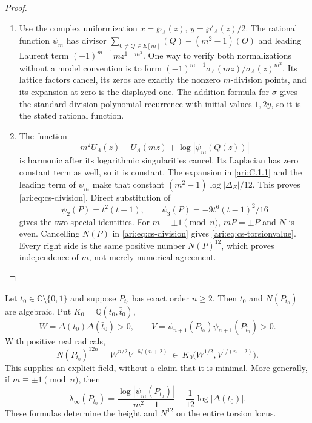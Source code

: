 \begin{proof}
\begin{enumerate}[label=\arabic*.,leftmargin=*]
\item Use the complex uniformization $x=\wp_\Lambda(z)$,
$y=\wp'_\Lambda(z)/2$. The rational function $\psi_m$ has divisor
$\sum_{0\ne Q\in E[m]}(Q)-(m^2-1)(O)$ and leading Laurent term
$(-1)^{m-1}m z^{1-m^2}$. One way to verify both normalizations without
a model convention is to form
$(-1)^{m-1}\sigma_\Lambda(mz)/\sigma_\Lambda(z)^{m^2}$.
Its lattice factors cancel, its zeros are exactly the nonzero
$m$-division points, and its expansion at zero is the displayed
one. The addition formula for $\sigma$ gives the standard
division-polynomial recurrence with initial values $1,2y$, so it is
the stated rational function.

\item The function
\[
 m^2U_\Lambda(z)-U_\Lambda(mz)
                    +\log|\psi_m(Q(z))|
\]
is harmonic after its logarithmic singularities cancel. Its
Laplacian has zero constant term as well, so it is constant.
The expansion in \ref{ari:C.1.1} and the leading term of $\psi_m$ make that
constant $(m^2-1)\log|\Delta_E|/12$. This proves
\eqref{ari:eq:cs-division}. Direct substitution of
\[
 \psi_2(P)=t^2(t-1),\qquad
 \psi_3(P)=-9t^6(t-1)^2/16
\]
gives the two special identities. For $m\equiv\pm1\pmod n$,
$mP=\pm P$ and $N$ is even. Cancelling $N(P)$ in
\eqref{ari:eq:cs-division} gives \eqref{ari:eq:cs-torsionvalue}.
Every right side is the same positive number $N(P)^{12}$, which
proves independence of $m$, not merely numerical agreement.
\end{enumerate}
\end{proof}

\begin{proposition}\hypertarget{tag-000R}{}\label{ari:C.4.3}

Let $t_0\in\mathbb C\setminus\{0,1\}$ and suppose $P_{t_0}$ has
exact order $n\ge2$. Then $t_0$ and $N(P_{t_0})$ are algebraic.
Put $K_0=\mathbb Q(t_0,\bar t_0)$,
\[
 W=\Delta(t_0)\Delta(\bar t_0)>0,\qquad
 V=\psi_{n+1}(P_{t_0})\psi_{n+1}(P_{\bar t_0})>0.
\]
With positive real radicals,
\[
 N(P_{t_0})^{12n}=W^{n/2}V^{-6/(n+2)}
 \ \in\ K_0\bigl(W^{1/2},V^{1/(n+2)}\bigr).
\]
This supplies an explicit field, without a claim that it is minimal.
More generally, if $m\equiv\pm1\pmod n$, then
\[
 \lambda_\infty(P_{t_0})
 =\frac{\log|\psi_m(P_{t_0})|}{m^2-1}
       -\frac1{12}\log|\Delta(t_0)|.
\]
These formulas determine the height and $N^{12}$ on the entire
torsion locus.
\end{proposition}


